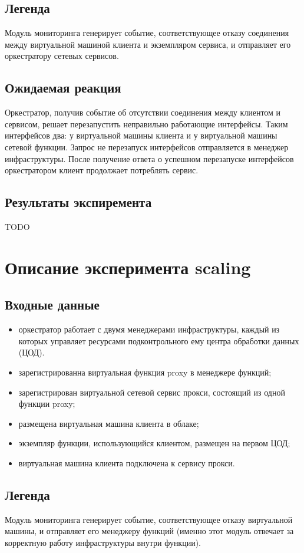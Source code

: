 \documentclass[oneside,final,14pt,a4paper]{extreport}
\begin{document}
\subsection{Легенда}
Модуль мониторинга генерирует событие, соответствующее отказу соединения между виртуальной машиной клиента и экземпляром сервиса, и отправляет его оркестратору сетевых сервисов.

\subsection{Ожидаемая реакция}
Оркестратор, получив событие об отсутствии соединения между клиентом и сервисом, решает перезапустить неправильно работающие интерфейсы. Таким интерфейсов два: у виртуальной машины клиента и у виртуальной машины сетевой функции. Запрос не перезапуск интерфейсов отправляется в менеджер инфраструктуры. После получение ответа о успешном перезапуске интерфейсов оркестратором клиент продолжает потреблять сервис.

\subsection{Результаты экспиремента}
TODO

\section{Описание эксперимента scaling}
\subsection{Входные данные}
\begin{itemize}
	\item оркестратор работает с двумя менеджерами инфраструктуры, каждый из которых управляет ресурсами подконтрольного ему центра обработки данных (ЦОД).
	\item зарегистрированна виртуальная функция proxy в менеджере функций;
	\item зарегистрирован виртуальной сетевой сервис прокси, состоящий из одной функции proxy;
	\item размещена виртуальная машина клиента в облаке;
	\item экземпляр функции, использующийся клиентом, размещен на первом ЦОД;
	\item виртуальная машина клиента подключена к сервису прокси.
\end{itemize}

\subsection{Легенда}
Модуль мониторинга генерирует событие, соответствующее отказу виртуальной машины, и отправляет его менеджеру функций (именно этот модуль отвечает за корректную работу инфраструктуры внутри функции).
\end{document}
